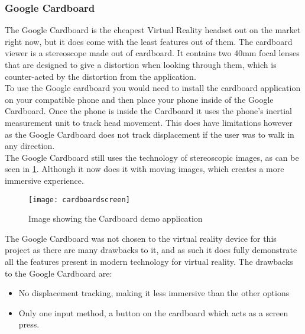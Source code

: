 \subsubsection{Google Cardboard}
The Google Cardboard is the cheapest Virtual Reality headset out on the market right now, but it does come with the least features out of them. The cardboard viewer is a stereoscope made out of cardboard. It contains two 40mm focal lenses that are designed to give a distortion when looking through them, which is counter-acted by the distortion from the application\cite{cardboarddev}.\\
	To use the Google cardboard you would need to install the cardboard application on your compatible phone and then place your phone inside of the Google Cardboard. Once the phone is inside the Cardboard it uses the phone's inertial measurement unit to track head movement. This does have limitations however as the Google Cardboard does not track displacement if the user was to walk in any direction. \\
	The Google Cardboard still uses the technology of stereoscopic images, as can be seen in \ref{fig:cardboard1}. Although it now does it with moving images, which creates a more immersive experience. \\

\begin{figure}[H]
	\texttt{[image: cardboardscreen]}
	\centering
	\caption{Image showing the Cardboard demo application}
	\label{fig:cardboard1}
\end{figure}

	The Google Cardboard was not chosen to the virtual reality device for this project as there are many drawbacks to it, and as such it does fully demonstrate all the features present in modern technology for virtual reality. The drawbacks to the Google Cardboard are:

\begin{itemize}
	\item No displacement tracking, making it less immersive than the other options
	\item Only one input method, a button on the cardboard which acts as a screen press.
\end{itemize}

